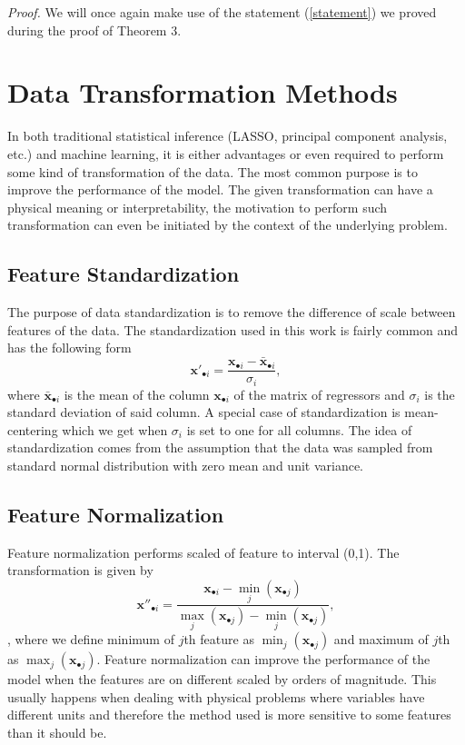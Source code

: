 \documentclass[11pt,american]{book} %
\theoremstyle{plain}
\theoremstyle{definition}
\begin{document}
\emph{Proof.} We will once again make use of the statement (\ref{statement}) we proved during the proof of Theorem 3.

\section{Data Transformation Methods}
In both traditional statistical inference (LASSO, principal component analysis, etc.) and machine learning, it is either advantages or even required to perform some kind of transformation of the data. The most common purpose is to improve the performance of the model. The given transformation can have a physical meaning or interpretability, the motivation to perform such transformation can even be initiated by the context of the underlying problem.
\subsection{Feature Standardization}
The purpose of data standardization is to remove the difference of scale between features of the data. The standardization used in this work is fairly common and has the following form
\begin{equation}
	\bm{x'}_{\bullet i} = \frac{\bm{x}_{\bullet i} - \bm{\bar{x}}_{\bullet i}  }{\sigma_i},
\end{equation}
where $\bm{\bar{x}}_{\bullet i}$ is the mean of the column $\bm{x}_{\bullet i}$ of the matrix of regressors and $\sigma_i$ is the standard deviation of said column.  A special case of standardization is mean-centering which we get when $\sigma_i$ is set to one for all columns. The idea of standardization comes from the assumption that the data was sampled from standard normal distribution with zero mean and unit variance.
\subsection{Feature Normalization}
Feature normalization performs scaled of feature to interval (0,1). The transformation is given by
\begin{equation}
	\bm{x''}_{\bullet i} = \frac{\bm{x}_{\bullet i} - \min_{j} (\bm{x}_{\bullet j})  }{\max_{j} (\bm{x}_{\bullet j}) - \min_{j} (\bm{x}_{\bullet j})},
\end{equation},
where we define minimum of $j$th feature as $\min_{j} (\bm{x}_{\bullet j})$ and maximum of $j$th as $\max_{j} (\bm{x}_{\bullet j})$. Feature normalization can improve the performance of the model when the features are on different scaled by orders of magnitude. This usually happens when dealing with physical problems where variables have different units and therefore the method used is more sensitive to some features than it should be.
\end{document}
